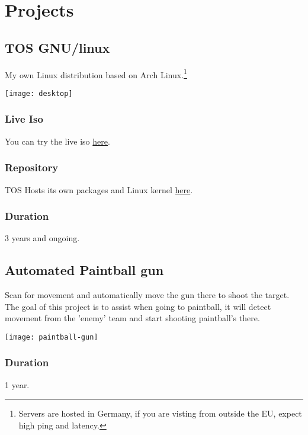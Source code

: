 \section{Proje\textcolor{mycolor}{cts}}
  \subsection{TOS GNU/linux}
    My own Linux distribution based on Arch Linux.\footnote{Servers are hosted in Germany, if you are visting from outside the EU, expect high ping and latency.}

    \begin{center}
      \texttt{[image: desktop]}
    \end{center}

    \subsubsection{Live Iso}
      You can try the live iso \href{https://tos.odex.be}{here}.\footnotemark[\value{footnote}]
    \subsubsection{Repository}
      TOS Hosts its own packages and Linux kernel \href{https://repo.odex.be/list.html}{here}.\footnotemark[\value{footnote}]
    \subsubsection{Duration}
      3 years and ongoing.

\pagebreak

  \subsection{Automated Paintball gun}
    Scan for movement and automatically move the gun there to shoot the target.
    The goal of this project is to assist when going to paintball,
    it will detect movement from the 'enemy' team and start shooting paintball's there.
    \begin{center}
      \texttt{[image: paintball-gun]}
    \end{center}
    \subsubsection{Duration}
      1 year.

